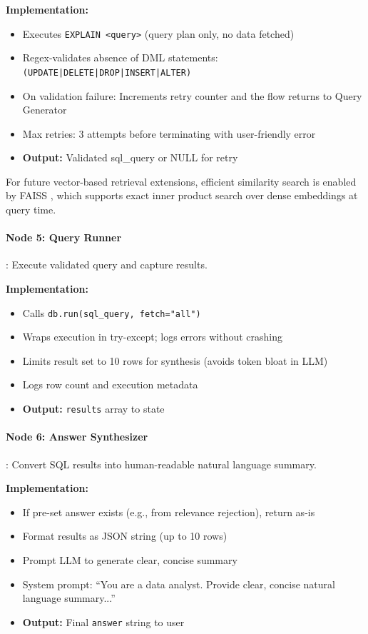 \documentclass{article}
\begin{document}
\noindent\textbf{Implementation:}

\begin{itemize}
  \item Executes \texttt{EXPLAIN <query>} (query plan only, no data fetched)
  \item Regex-validates absence of DML statements: \texttt{(UPDATE|DELETE|DROP|INSERT|ALTER)}
  \item On validation failure: Increments retry counter and the flow returns to Query Generator
  \item Max retries: 3 attempts before terminating with user-friendly error
  \item \textbf{Output:} Validated sql\_query or NULL for retry
\end{itemize}

For future vector-based retrieval extensions, efficient similarity search is enabled by FAISS \cite{johnson2017faiss}, which supports exact inner product search over dense embeddings at query time.

\paragraph{Node 5: Query Runner}: Execute validated query and capture results.

\textbf{Implementation:}

\begin{itemize}
  \item Calls \texttt{db.run(sql\_query, fetch="all")}
  \item Wraps execution in try-except; logs errors without crashing
  \item Limits result set to 10 rows for synthesis (avoids token bloat in LLM)
  \item Logs row count and execution metadata
  \item \textbf{Output:} \texttt{results} array to state
\end{itemize}

\paragraph{Node 6: Answer Synthesizer}: Convert SQL results into human-readable natural language summary.

\textbf{Implementation:}

\begin{itemize}
  \item If pre-set answer exists (e.g., from relevance rejection), return as-is
  \item Format results as JSON string (up to 10 rows)
  \item Prompt LLM to generate clear, concise summary
  \item System prompt: ``You are a data analyst. Provide clear, concise natural language summary...''
  \item \textbf{Output:} Final \texttt{answer} string to user
\end{itemize}
\end{document}
